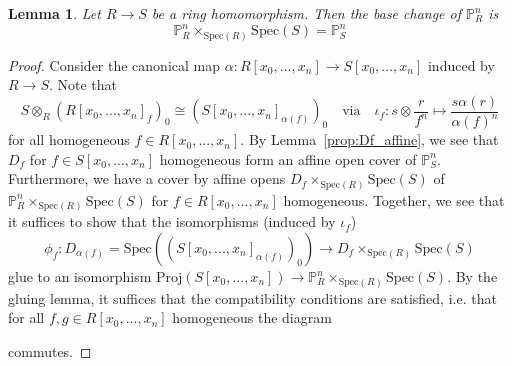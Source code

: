 \documentclass{scrartcl}
\renewcommand{\P}{\mathbb{P}}
\newcommand{\Spec}{\mathrm{Spec}}
\newcommand{\Proj}{\mathrm{Proj}}
\newtheorem{lemma}[prop]{Lemma}
\theoremstyle{definition}
\begin{document}
\begin{lemma}
    Let $R \to S$ be a ring homomorphism.
    Then the base change of $\P_R^n$ is
    \begin{equation*}
        \P_R^n \times_{\Spec(R)} \Spec(S) = \P_S^n
    \end{equation*}
\end{lemma}
\begin{proof}
    Consider the canonical map $\alpha: R[x_0, ..., x_n] \to S[x_0, ..., x_n]$ induced by $R \to S$.
    Note that
    \begin{equation*}
        S \otimes_R (R[x_0, ..., x_n]_f)_0 \cong (S[x_0, ..., x_n]_{\alpha(f)})_0 \quad \text{via} \quad \iota_f: s \otimes \frac r {f^n} \mapsto \frac {s\alpha(r)} {\alpha(f)^n}
    \end{equation*}
    for all homogeneous $f \in R[x_0, ..., x_n]$.
    By Lemma~\ref{prop:Df_affine}, we see that $D_f$ for $f \in S[x_0, ..., x_n]$ homogeneous form an affine open cover of $\P_S^n$.
    Furthermore, we have a cover by affine opens $D_f \times_{\Spec(R)} \Spec(S)$ of $\P_R^n \times_{\Spec(R)} \Spec(S)$ for $f \in R[x_0, ..., x_n]$ homogeneous.
    Together, we see that it suffices to show that the isomorphisms (induced by $\iota_f$)
    \begin{equation*}
        \phi_f: D_{\alpha(f)} = \Spec((S[x_0, ..., x_n]_{\alpha(f)})_0) \to D_f \times_{\Spec(R)} \Spec(S)
    \end{equation*}
    glue to an isomorphism $\Proj(S[x_0, ..., x_n]) \to \P_R^n \times_{\Spec(R)} \Spec(S)$.
    By the gluing lemma, it suffices that the compatibility conditions are satisfied, i.e. that for all $f, g \in R[x_0, ..., x_n]$ homogeneous the diagram
    \begin{center}
    \end{center}
    commutes.


\end{proof}
\end{document}
